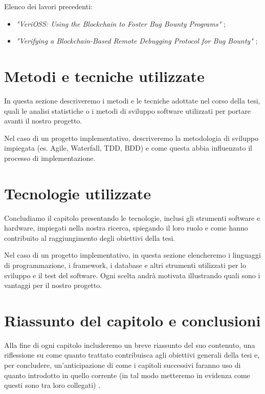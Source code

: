 \medskip

Elenco dei lavori precedenti:

\begin{itemize}

\item \textit{"VeriOSS: Using the Blockchain to Foster Bug Bounty Programs"} \cite{canidio2021verioss};

\item \textit{"Verifying a Blockchain-Based Remote Debugging Protocol for Bug Bounty"} \cite{degano2021verioss};

\end{itemize}


\section{Metodi e tecniche utilizzate}

In questa sezione descriveremo i metodi e le tecniche adottate nel corso della tesi, quali le analisi statistiche o i metodi di sviluppo software utilizzati per portare avanti il nostro progetto.

\medskip

Nel caso di un progetto implementativo, descriveremo la metodologia di sviluppo impiegata (es. Agile, Waterfall, TDD, BDD) e come questa abbia influenzato il processo di implementazione.

\section{Tecnologie utilizzate}

Concludiamo il capitolo presentando le tecnologie, inclusi gli strumenti software e hardware, impiegati nella nostra ricerca, spiegando il loro ruolo e come hanno contribuito al raggiungimento degli obiettivi della tesi.

\medskip

Nel caso di un progetto implementativo, in questa sezione elencheremo i linguaggi di programmazione, i framework, i database e altri strumenti utilizzati per lo sviluppo e il test del software. Ogni scelta andrà motivata illustrando quali sono i vantaggi per il nostro progetto.

\section{Riassunto del capitolo e conclusioni}

Alla fine di ogni capitolo includeremo un breve riassunto del suo contenuto, una riflessione su come quanto trattato contribuisca agli obiettivi generali della tesi e, per concludere, un'anticipazione di come i capitoli successivi faranno uso di quanto introdotto in quello corrente (in tal modo metteremo in evidenza come questi sono tra loro collegati) \cite{zobel2015writing}.